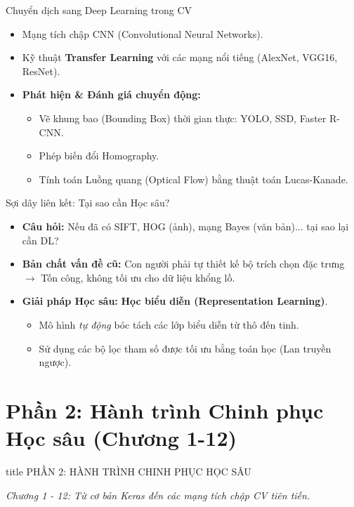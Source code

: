 \documentclass[aspectratio=169]{beamer}
\begin{document}
\begin{frame}{Chuyển dịch sang Deep Learning trong CV}
    \begin{itemize}
        \item Mạng tích chập CNN (Convolutional Neural Networks).
        \item Kỹ thuật \textbf{Transfer Learning} với các mạng nổi tiếng (AlexNet, VGG16, ResNet).
        \item \textbf{Phát hiện \& Đánh giá chuyển động:}
        \begin{itemize}
            \item Vẽ khung bao (Bounding Box) thời gian thực: YOLO, SSD, Faster R-CNN.
            \item Phép biến đổi Homography.
            \item Tính toán Luồng quang (Optical Flow) bằng thuật toán Lucas-Kanade.
        \end{itemize}
    \end{itemize}
\end{frame}

\begin{frame}{Sợi dây liên kết: Tại sao cần Học sâu?}
    \begin{itemize}
        \item \textbf{Câu hỏi:} Nếu đã có SIFT, HOG (ảnh), mạng Bayes (văn bản)... tại sao lại cần DL?
        \item \textbf{Bản chất vấn đề cũ:} Con người phải tự thiết kế bộ trích chọn đặc trưng $\rightarrow$ Tốn công, không tối ưu cho dữ liệu khổng lồ.
        \item \textbf{Giải pháp Học sâu:} \textbf{Học biểu diễn (Representation Learning)}.
        \begin{itemize}
            \item Mô hình \textit{tự động} bóc tách các lớp biểu diễn từ thô đến tinh.
            \item Sử dụng các bộ lọc tham số được tối ưu bằng toán học (Lan truyền ngược).
        \end{itemize}
    \end{itemize}
\end{frame}

\section{Phần 2: Hành trình Chinh phục Học sâu (Chương 1-12)}

\begin{frame}
    \vfill
    \centering
    \begin{beamercolorbox}[sep=8pt,center,shadow=true,rounded=true]{title}
        \Large PHẦN 2: HÀNH TRÌNH CHINH PHỤC HỌC SÂU
    \end{beamercolorbox}
    \vspace{0.5cm}
    \textit{Chương 1 - 12: Từ cơ bản Keras đến các mạng tích chập CV tiên tiến.}
    \vfill
\end{frame}
\end{document}
